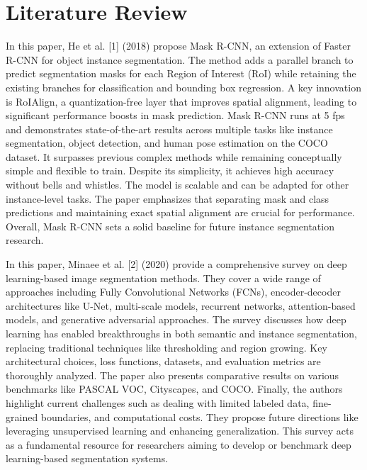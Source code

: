 \chapter{Literature Review}
\label{chap:literature_review}


In this paper, He et al. [1] (2018) propose Mask R-CNN, an extension of Faster R-CNN for object instance segmentation. The method adds a parallel branch to predict segmentation masks for each Region of Interest (RoI) while retaining the existing branches for classification and bounding box regression. A key innovation is RoIAlign, a quantization-free layer that improves spatial alignment, leading to significant performance boosts in mask prediction. Mask R-CNN runs at 5 fps and demonstrates state-of-the-art results across multiple tasks like instance segmentation, object detection, and human pose estimation on the COCO dataset. It surpasses previous complex methods while remaining conceptually simple and flexible to train. Despite its simplicity, it achieves high accuracy without bells and whistles. The model is scalable and can be adapted for other instance-level tasks. The paper emphasizes that separating mask and class predictions and maintaining exact spatial alignment are crucial for performance. Overall, Mask R-CNN sets a solid baseline for future instance segmentation research.


In this paper, Minaee et al. [2] (2020) provide a comprehensive survey on deep learning-based image segmentation methods. They cover a wide range of approaches including Fully Convolutional Networks (FCNs), encoder-decoder architectures like U-Net, multi-scale models, recurrent networks, attention-based models, and generative adversarial approaches. The survey discusses how deep learning has enabled breakthroughs in both semantic and instance segmentation, replacing traditional techniques like thresholding and region growing. Key architectural choices, loss functions, datasets, and evaluation metrics are thoroughly analyzed. The paper also presents comparative results on various benchmarks like PASCAL VOC, Cityscapes, and COCO. Finally, the authors highlight current challenges such as dealing with limited labeled data, fine-grained boundaries, and computational costs. They propose future directions like leveraging unsupervised learning and enhancing generalization. This survey acts as a fundamental resource for researchers aiming to develop or benchmark deep learning-based segmentation systems.


